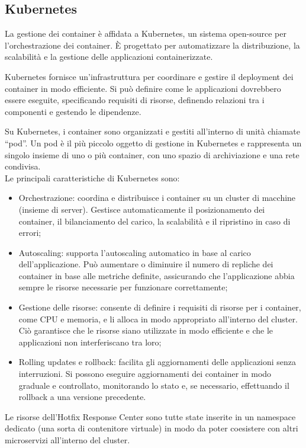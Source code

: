 \subsection{Kubernetes}
La gestione dei container è affidata a Kubernetes, un sistema open-source per 
l'orchestrazione dei container. È progettato per automatizzare la distribuzione, 
la scalabilità e la gestione delle applicazioni containerizzate.

Kubernetes fornisce un'infrastruttura per coordinare e gestire il deployment 
dei container in modo efficiente. Si può definire come le applicazioni dovrebbero 
essere eseguite, specificando requisiti di risorse, definendo relazioni tra i 
componenti e gestendo le dipendenze.

Su Kubernetes, i container sono organizzati e gestiti all'interno di unità 
chiamate “pod”. Un pod è il più piccolo oggetto di gestione in Kubernetes e 
rappresenta un singolo insieme di uno o più container, con uno spazio di 
archiviazione e una rete condivisa.\\

\noindent Le principali caratteristiche di  Kubernetes sono:
\begin{itemize}
\item Orchestrazione: coordina e distribuisce i container su un cluster di macchine (insieme di server). Gestisce automaticamente il posizionamento dei container, il bilanciamento del carico, la scalabilità e il ripristino in caso di errori;
\item Autoscaling: supporta l'autoscaling automatico in base al carico dell'applicazione. Può aumentare o diminuire il numero di repliche dei container in base alle metriche definite, assicurando che l'applicazione abbia sempre le risorse necessarie per funzionare correttamente;
\item Gestione delle risorse: consente di definire i requisiti di risorse per i container, come CPU e memoria, e li alloca in modo appropriato all'interno del cluster. Ciò garantisce che le risorse siano utilizzate in modo efficiente e che le applicazioni non interferiscano tra loro;
\item Rolling updates e rollback: facilita gli aggiornamenti delle applicazioni senza interruzioni. Si possono eseguire aggiornamenti dei container in modo graduale e controllato, monitorando lo stato e, se necessario, effettuando il rollback a una versione precedente.
\end{itemize}

Le risorse dell’Hotfix Response Center sono tutte state inserite in un namespace 
dedicato (una sorta di contenitore virtuale) in modo da poter coesistere con 
altri microservizi all'interno del cluster.\\


